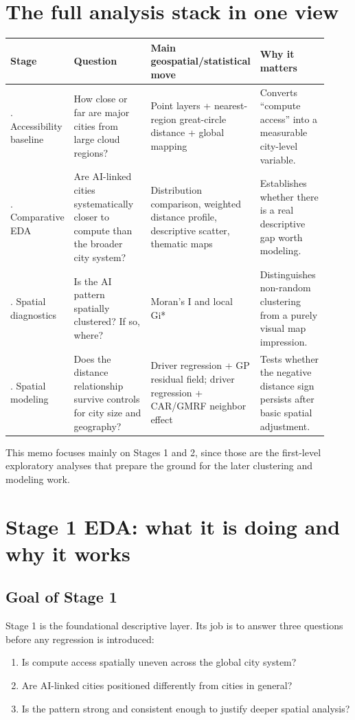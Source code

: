 \documentclass[11pt]{article}
\begin{document}
\section{The full analysis stack in one view}
\begin{longtable}{>{\raggedright\arraybackslash}p{0.13\linewidth} >{\raggedright\arraybackslash}p{0.32\linewidth} >{\raggedright\arraybackslash}p{0.22\linewidth} >{\raggedright\arraybackslash}p{0.25\linewidth}}
\toprule
\textbf{Stage} & \textbf{Question} & \textbf{Main geospatial/statistical move} & \textbf{Why it matters} \\
\midrule
1. Accessibility baseline & How close or far are major cities from large cloud regions? & Point layers + nearest-region great-circle distance + global mapping & Converts ``compute access'' into a measurable city-level variable. \\
2. Comparative EDA & Are AI-linked cities systematically closer to compute than the broader city system? & Distribution comparison, weighted distance profile, descriptive scatter, thematic maps & Establishes whether there is a real descriptive gap worth modeling. \\
3. Spatial diagnostics & Is the AI pattern spatially clustered? If so, where? & Moran's I and local Gi* & Distinguishes non-random clustering from a purely visual map impression. \\
4. Spatial modeling & Does the distance relationship survive controls for city size and geography? & Driver regression + GP residual field; driver regression + CAR/GMRF neighbor effect & Tests whether the negative distance sign persists after basic spatial adjustment. \\
\bottomrule
\end{longtable}

This memo focuses mainly on Stages 1 and 2, since those are the first-level exploratory analyses that prepare the ground for the later clustering and modeling work.

\section{Stage 1 EDA: what it is doing and why it works}

\subsection{Goal of Stage 1}
Stage 1 is the foundational descriptive layer. Its job is to answer three questions before any regression is introduced:
\begin{enumerate}[leftmargin=*]
    \item Is compute access spatially uneven across the global city system?
    \item Are AI-linked cities positioned differently from cities in general?
    \item Is the pattern strong and consistent enough to justify deeper spatial analysis?
\end{enumerate}
\end{document}
